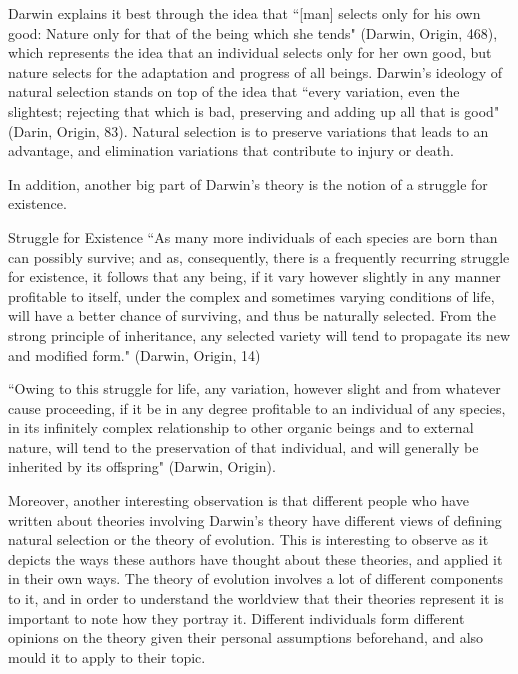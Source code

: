 \documentclass[11pt, oneside]{article}
\begin{document}
\par Darwin explains it best through the idea that ``[man] selects only for his own good: Nature only for that of the being which she tends" (Darwin, Origin, 468), which represents the idea that an individual selects only for her own good, but nature selects for the adaptation and progress of all beings. Darwin's ideology of natural selection stands on top of the idea that ``every variation, even the slightest; rejecting that which is bad, preserving and adding up all that is good" (Darin, Origin, 83). Natural selection is to preserve variations that leads to an advantage, and elimination variations that contribute to injury or death. 

\par In addition, another big part of Darwin's theory is the notion of a struggle for existence. 

\par Struggle for Existence ``As many more individuals of each species are born than can possibly survive; and as, consequently, there is a frequently recurring struggle for existence, it follows that any being, if it vary however slightly in any manner profitable to itself, under the complex and sometimes varying conditions of life, will have a better chance of surviving, and thus be naturally selected. From the strong principle of inheritance, any selected variety will tend to propagate its new and modified form." (Darwin, Origin, 14)

\par ``Owing to this struggle for life, any variation, however slight and from whatever cause proceeding, if it be in any degree profitable to an individual of any species, in its infinitely complex relationship to other organic beings and to external nature, will tend to the preservation of that individual, and will generally be inherited by its offspring" (Darwin, Origin).


\par Moreover, another interesting observation is that different people who have written about theories involving Darwin's theory have different views of defining natural selection or the theory of evolution. This is interesting to observe as it depicts the ways these authors have thought about these theories, and applied it in their own ways. The theory of evolution involves a lot of different components to it, and in order to understand the worldview that their theories represent it is important to note how they portray it. Different individuals form different opinions on the theory given their personal assumptions beforehand, and also mould it to apply to their topic.
\end{document}
